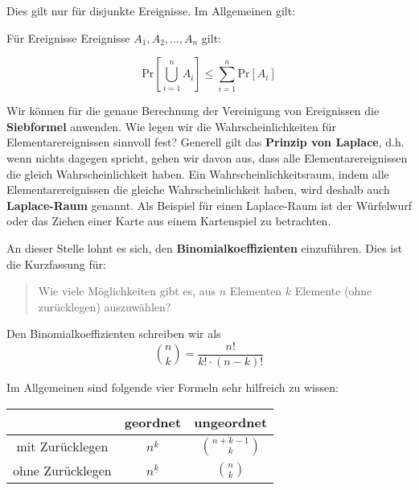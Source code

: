 Dies gilt nur für disjunkte Ereignisse. Im Allgemeinen gilt:

\begin{satz}
    Für Ereignisse Ereignisse $A_1, A_2, ... , A_n$ gilt:

    $$\text{Pr}[ \bigcup_{i=1}^{n} A_i] \leq \sum_{i = 1}^{n} \text{Pr}[A_i]$$
\end{satz}
\bigskip

Wir können für die genaue Berechnung der Vereinigung von Ereignissen die \textbf{Siebformel} anwenden.
Wie legen wir die Wahrscheinlichkeiten für Elementarereignissen sinnvoll fest? Generell gilt das
\textbf{Prinzip von Laplace}, d.h. wenn nichts dagegen spricht, gehen wir davon aus, dass alle 
Elementarereignissen die gleich Wahrscheinlichkeit haben. Ein Wahrscheinlichkeitsraum, indem alle
Elementarereignissen die gleiche Wahrscheinlichkeit haben, wird deshalb auch \textbf{Laplace-Raum}
genannt. Als Beispiel für einen Laplace-Raum ist der Würfelwurf oder das Ziehen einer Karte aus einem
Kartenspiel zu betrachten.


An dieser Stelle lohnt es sich, den \textbf{Binomialkoeffizienten} einzuführen. Dies ist die Kurzfassung
für: 

\begin{quote}
    Wie viele Möglichkeiten gibt es, aus $n$ Elementen $k$ Elemente (ohne zurücklegen) auszuwählen?
\end{quote}

Den Binomialkoeffizienten schreiben wir als 
$$\binom{n}{k} = \frac{n!}{k! \cdot (n-k)!}$$

Im Allgemeinen sind folgende vier Formeln sehr hilfreich zu wissen:

\Large
\begin{center}
    \begin{tabular}[h]{c || c | c }
        & geordnet & ungeordnet \\
       \hline
       \hline
       mit Zurücklegen & $n^k$ & $\binom{n + k - 1}{k}$  \\
       \hline
       ohne Zurücklegen & $n^{\underline{k}}$ & $\binom{n}{k}$ \\
       \hline
   \end{tabular}
\end{center}
\normalsize

